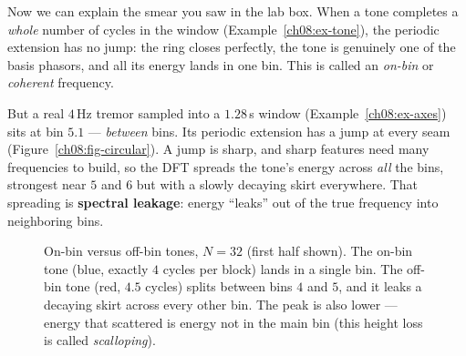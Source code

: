 Now we can explain the smear you saw in the lab box. When a tone completes a
\emph{whole} number of cycles in the window (Example~\ref{ch08:ex-tone}), the
periodic extension has no jump: the ring closes perfectly, the tone is genuinely
one of the basis phasors, and all its energy lands in one bin. This is called an
\emph{on-bin} or \emph{coherent} frequency.

But a real $4$\,Hz tremor sampled into a $1.28$\,s window (Example~\ref{ch08:ex-axes})
sits at bin $5.1$ --- \emph{between} bins. Its periodic extension has a jump at
every seam (Figure~\ref{ch08:fig-circular}). A jump is sharp, and sharp features
need many frequencies to build, so the DFT spreads the tone's energy across
\emph{all} the bins, strongest near $5$ and $6$ but with a slowly decaying skirt
everywhere. That spreading is \textbf{spectral leakage}: energy ``leaks'' out of
the true frequency into neighboring bins.

\begin{figure}[H]
\centering
{}
\caption{On-bin versus off-bin tones, $N=32$ (first half shown). The on-bin tone
(blue, exactly $4$ cycles per block) lands in a single bin. The off-bin tone (red,
$4.5$ cycles) splits between bins $4$ and $5$, and it leaks a decaying skirt across
every other bin. The peak is also lower --- energy that scattered is energy not in
the main bin (this height loss is called \emph{scalloping}).}
\label{ch08:fig-leakage}
\end{figure}

